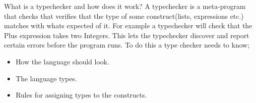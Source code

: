\documentclass{article}
\begin{document}
            What is a typechecker and how does it work? 
            A typechecker is a meta-program that checks that verifies that the type of some construct(lists, expressions etc.) matches with whats expected of it.
            For example a typechecker will check that the Plus \gls{expression} takes two Integers. This lets the typechecker discover and report certain errors before the program runs. 
            To do this a type checker needs to know;
            \begin{itemize}
                \item How the language should look.
                \item The language types.
                \item Rules for assigning types to the constructs.
            \end{itemize}
\end{document}
